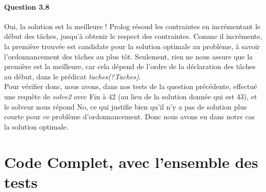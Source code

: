 \documentclass[11pt]{article} %
\begin{document}
\paragraph{Question 3.8}
Oui, la solution est la meilleure !
Prolog résoud les contraintes en incrémentant le début des tâches, jusqu'à obtenir le respect des contraintes.
Comme il incrémente, la première trouvée est candidate pour la solution optimale au problème, à savoir l'ordonnancement des tâches au plus tôt. Seulement, rien ne nous assure que la première est la meilleure, car cela dépend de l'ordre de la déclaration des tâches au début, dans le prédicat \textit{taches(?Taches)}.\\ Pour vérifier donc, nous avons, dans nos tests de la question précédente, effectué une requête de \textit{solve2} avec Fin à 42 (au lieu de la solution donnée qui est 43), et le solveur nous répond No, ce qui justifie bien qu'il n'y a pas de solution plus courte pour ce problème d'ordonnancement. Donc nous avons eu dans notre cas la solution optimale.
\newpage

\section{Code Complet, avec l'ensemble des tests}

\end{document}
